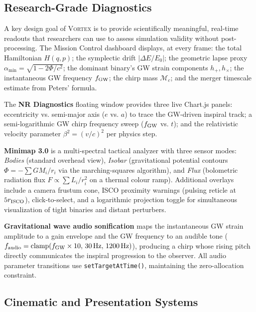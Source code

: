 \documentclass[aps,prd,twocolumn,superscriptaddress,nofootinbib,showpacs,
               longbibliography]{revtex4-2}
\newcommand{\code}[1]{\texttt{#1}}
\begin{document}
\subsection{Research-Grade Diagnostics}
\label{sec:vortex_diagnostics}

A key design goal of \textsc{Vortex} is to provide scientifically
meaningful, real-time readouts that researchers can use to assess
simulation validity without post-processing.
The Mission Control dashboard displays, at every frame:
the total Hamiltonian $H(q,p)$;
the symplectic drift $|\Delta E/E_0|$;
the geometric lapse proxy $\alpha_{\min} = \sqrt{1 - 2\Phi/c^2}$;
the dominant binary's GW strain components $h_+, h_\times$;
the instantaneous GW frequency $f_{\rm GW}$;
the chirp mass $\mathcal{M}_c$;
and the merger timescale estimate from Peters' formula.

The \textbf{NR Diagnostics} floating window provides three live
Chart.js panels: eccentricity vs. semi-major axis ($e$ vs. $a$) to
trace the GW-driven inspiral track; a semi-logarithmic GW chirp
frequency sweep ($f_{\rm GW}$ vs. $t$); and the relativistic velocity
parameter $\beta^2 = (v/c)^2$ per physics step.

\textbf{Minimap 3.0} is a multi-spectral tactical analyzer with three
sensor modes: \emph{Bodies} (standard overhead view), \emph{Isobar}
(gravitational potential contours $\Phi = -\sum GM_i/r_i$ via the
marching-squares algorithm), and \emph{Flux} (bolometric radiation flux
$F \propto \sum L_i/r_i^2$ on a thermal colour ramp).
Additional overlays include a camera frustum cone, ISCO proximity
warnings (pulsing reticle at $5r_{\rm ISCO}$), click-to-select,
and a logarithmic projection toggle for simultaneous visualization of
tight binaries and distant perturbers.

\textbf{Gravitational wave audio sonification}
maps the instantaneous GW strain amplitude to a gain envelope and the
GW frequency to an audible tone ($f_{\rm audio} = \text{clamp}(f_{\rm GW}\times 10,\,30\text{\,Hz},\,1200\text{\,Hz})$),
producing a chirp whose rising pitch directly communicates the inspiral
progression to the observer.
All audio parameter transitions use \code{setTargetAtTime()}, maintaining
the zero-allocation constraint.

\subsection{Cinematic and Presentation Systems}
\label{sec:vortex_cinematic}
\end{document}
